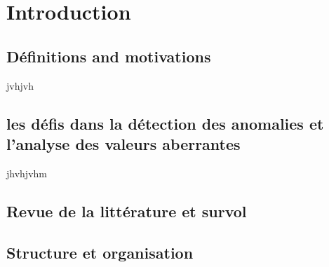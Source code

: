 

\section{Introduction}
\subsection{ Définitions and motivations}
jvhjvh

\subsection{ les défis dans la détection  des anomalies et  l’analyse des valeurs aberrantes}
jhvhjvhm
\subsection{ Revue de la littérature et survol}
\subsection{ Structure et organisation}
